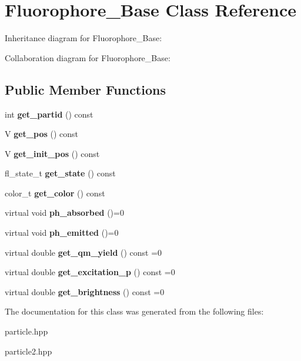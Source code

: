 \hypertarget{classFluorophore__Base}{}\section{Fluorophore\+\_\+\+Base Class Reference}
\label{classFluorophore__Base}


Inheritance diagram for Fluorophore\+\_\+\+Base\+:


Collaboration diagram for Fluorophore\+\_\+\+Base\+:
\subsection*{Public Member Functions}
\begin{DoxyCompactItemize}
\item 
\mbox{\label{classFluorophore__Base_a2f1d7fc9ca35b48fdccbd1308e233807}} 
int {\bfseries get\+\_\+partid} () const
\item 
\mbox{\label{classFluorophore__Base_af3453c70f01873f8a08f753c3c9b6164}} 
V {\bfseries get\+\_\+pos} () const
\item 
\mbox{\label{classFluorophore__Base_a59b7370678b4c5dab3b10c5187d99a59}} 
V {\bfseries get\+\_\+init\+\_\+pos} () const
\item 
\mbox{\label{classFluorophore__Base_acde0281d48f143ce3de01e869ea69db6}} 
fl\+\_\+state\+\_\+t {\bfseries get\+\_\+state} () const
\item 
\mbox{\label{classFluorophore__Base_a99915d932ee92af7f25a12135a0e16bd}} 
color\+\_\+t {\bfseries get\+\_\+color} () const
\item 
\mbox{\label{classFluorophore__Base_a68904c62a067bf9233bd9d21ac1acbb0}} 
virtual void {\bfseries ph\+\_\+absorbed} ()=0
\item 
\mbox{\label{classFluorophore__Base_ad86f25f8171d40c3d6d8129165345014}} 
virtual void {\bfseries ph\+\_\+emitted} ()=0
\item 
\mbox{\label{classFluorophore__Base_a4d0b2aa1b9b6c7c0a7f87e9cde510759}} 
virtual double {\bfseries get\+\_\+qm\+\_\+yield} () const =0
\item 
\mbox{\label{classFluorophore__Base_a649d0423878c0030eb1fa48c21143421}} 
virtual double {\bfseries get\+\_\+excitation\+\_\+p} () const =0
\item 
\mbox{\label{classFluorophore__Base_a7f710ea1f49eceddd2bc010e3c5d26d9}} 
virtual double {\bfseries get\+\_\+brightness} () const =0
\end{DoxyCompactItemize}


The documentation for this class was generated from the following files\+:\begin{DoxyCompactItemize}
\item 
particle.\+hpp\item 
particle2.\+hpp\end{DoxyCompactItemize}
